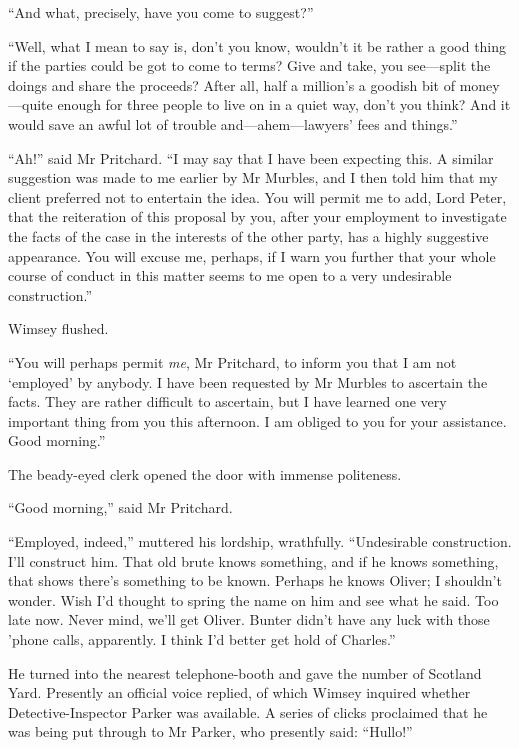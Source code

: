 \enquote{And what, precisely, have you come to suggest?}

\enquote{Well, what I mean to say is, don't you know, wouldn't it be rather a good thing if the parties could be got to come to terms? Give and take, you see\allowbreak---\allowbreak split the doings and share the proceeds? After all, half a million's a goodish bit of money\allowbreak---\allowbreak quite enough for three people to live on in a quiet way, don't you think? And it would save an awful lot of trouble and\allowbreak---\allowbreak ahem---lawyers' fees and things.}

\enquote{Ah!} said Mr Pritchard. \enquote{I may say that I have been expecting this. A similar suggestion was made to me earlier by Mr Murbles, and I then told him that my client preferred not to entertain the idea. You will permit me to add, Lord Peter, that the reiteration of this proposal by you, after your employment to investigate the facts of the case in the interests of the other party, has a highly suggestive appearance. You will excuse me, perhaps, if I warn you further that your whole course of conduct in this matter seems to me open to a very undesirable construction.}

Wimsey flushed.

\enquote{You will perhaps permit \textit{me}, Mr Pritchard, to inform you that I am not \enquote{employed} by anybody. I have been requested by Mr Murbles to ascertain the facts. They are rather difficult to ascertain, but I have learned one very important thing from you this afternoon. I am obliged to you for your assistance. Good morning.}

The beady-eyed clerk opened the door with immense politeness.

\enquote{Good morning,} said Mr Pritchard.

\enquote{Employed, indeed,} muttered his lordship, wrathfully. \enquote{Undesirable construction. I'll construct him. That old brute knows something, and if he knows something, that shows there's something to be known. Perhaps he knows Oliver; I shouldn't wonder. Wish I'd thought to spring the name on him and see what he said. Too late now. Never mind, we'll get Oliver. Bunter didn't have any luck with those 'phone calls, apparently. I think I'd better get hold of Charles.}

He turned into the nearest telephone-booth and gave the number of Scotland Yard. Presently an official voice replied, of which Wimsey inquired whether Detective-Inspector Parker was available. A series of clicks proclaimed that he was being put through to Mr Parker, who presently said: \enquote{Hullo!}

